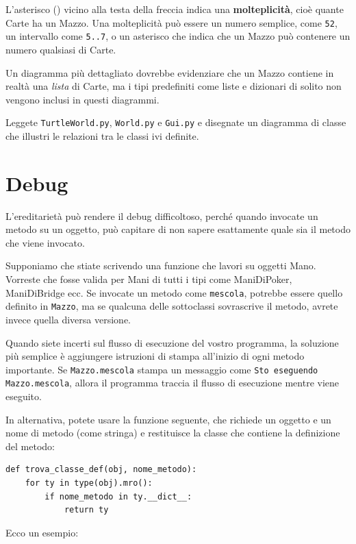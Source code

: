 \documentclass[10pt]{book}
\begin{document}
L'asterisco ({\tt *}) vicino alla testa della freccia indica una
{\bf molteplicità}, cioè quante Carte ha un Mazzo. Una molteplicità può essere un numero semplice, come {\tt 52}, un intervallo come {\tt 5..7}, o un asterisco che indica che un Mazzo può contenere un numero qualsiasi di Carte.

Un diagramma più dettagliato dovrebbe evidenziare che un Mazzo contiene in realtà una {\em lista} di Carte, ma i tipi predefiniti come liste e dizionari di solito non vengono inclusi in questi diagrammi.

\vspace{0.2in}
\begin{exercise}

Leggete {\tt TurtleWorld.py}, {\tt World.py} e {\tt Gui.py}
e disegnate un diagramma di classe che illustri le relazioni tra le classi ivi definite.

\end{exercise}


\section{Debug}

L'ereditarietà può rendere il debug difficoltoso, perché quando invocate un metodo su un oggetto, può capitare di non sapere esattamente quale sia il metodo che viene invocato.

Supponiamo che stiate scrivendo una funzione che lavori su oggetti Mano. Vorreste che fosse valida per Mani di tutti i tipi come ManiDiPoker, ManiDiBridge ecc. Se invocate un metodo come
{\tt mescola}, potrebbe essere quello definito in {\tt Mazzo},
ma se qualcuna delle sottoclassi sovrascrive il metodo, avrete invece quella diversa versione.

Quando siete incerti sul flusso di esecuzione del vostro programma, la soluzione più semplice è aggiungere istruzioni di stampa all'inizio di ogni metodo importante. Se {\tt Mazzo.mescola} stampa un messaggio come {\tt Sto eseguendo Mazzo.mescola}, allora il programma traccia il flusso di esecuzione mentre viene eseguito.

In alternativa, potete usare la funzione seguente, che richiede un oggetto e un nome di metodo (come stringa) e restituisce la classe che contiene la definizione del metodo:

\begin{verbatim}
def trova_classe_def(obj, nome_metodo):
    for ty in type(obj).mro():
        if nome_metodo in ty.__dict__:
            return ty
\end{verbatim}
%
Ecco un esempio:
\end{document}
